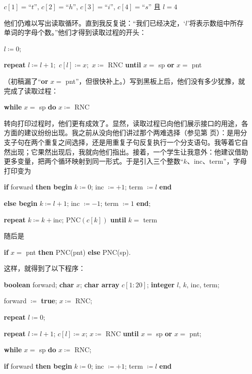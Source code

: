 \quad $c[1] = $``$t$'', $c[2] = $``$h$'', $c[3] = $``$i$'', $c[4] = $``$s$'' 且 $l = 4$

他们仍难以写出读取循环。直到我反复说：“我们已经决定，‘$l$’将表示数组中所存单词的字母个数。”他们才得到读取过程的开头：

\quad $l \coloneq 0; $

\quad \textbf{repeat} $l \coloneq l + 1;$ $c[l] \coloneq x;$ $x\coloneq$ RNC \textbf{until} $x =$ sp \textbf{or} $x =$ pnt

\noindent
（初稿漏了“\textbf{or} $x =$ pnt”，但很快补上。）写到黑板上后，他们没有多少犹豫，就完成了读取过程：

\quad \textbf{while} $x =$ sp \textbf{do} $x\coloneq$ RNC

转向打印过程时，他们更有成效了。显然，读取过程已向他们展示接口的用途，各方面的建议纷纷出现。我之前从没向他们讲过那个两难选择（参见第 \pageref{pg:dilema} 页）：是用分支子句在两个重复之间选择，还是用重复子句反复执行一个分支语句。我等着它自然出现；它果然出现后，我就向他们指出。接着，一个学生让我意外：他建议借助更多变量，把两个循环映射到同一形式。于是引入三个整数“$k$、inc、term”，字母打印变为

\quad \textbf{if} forward \textbf{then begin} $k \coloneq 0$; inc $\coloneq + 1$; term $\coloneq l$ \textbf{end}

\tabto{5.8em}\quad \textbf{else begin} $k \coloneq l + 1$; inc $\coloneq - 1$; term $\coloneq 1$ \textbf{end};

\quad \textbf{repeat} $k \coloneq k + \text{inc}$; $\text{PNC}(c[k])$ \textbf{until} $k =$ term

\noindent
随后是

\quad \textbf{if} $x =$ pnt \textbf{then} PNC(pnt) \textbf{else} PNC(sp).

这样，就得到了以下程序：

\quad \textbf{boolean} forward; \textbf{char} $x$; \textbf{char array} $c[1:20]$; \textbf{integer} $l$, $k$, inc, term;

\quad forward $\coloneq$ \textbf{true}; $x \coloneq$ RNC;

\quad \textbf{repeat} $l \coloneq 0$;

\quad \quad \textbf{repeat} $l\coloneq l + 1$; $c[l]\coloneq x$; $x \coloneq$ RNC \textbf{until} $x =$ sp \textbf{or} $x =$ pnt;

\quad \quad \textbf{while} $x =$ sp \textbf{do} $x\coloneq$ RNC;

\quad \quad \textbf{if} forward \textbf{then begin} $k\coloneq 0$; inc $\coloneq + 1$; term $\coloneq l$ \textbf{end}

